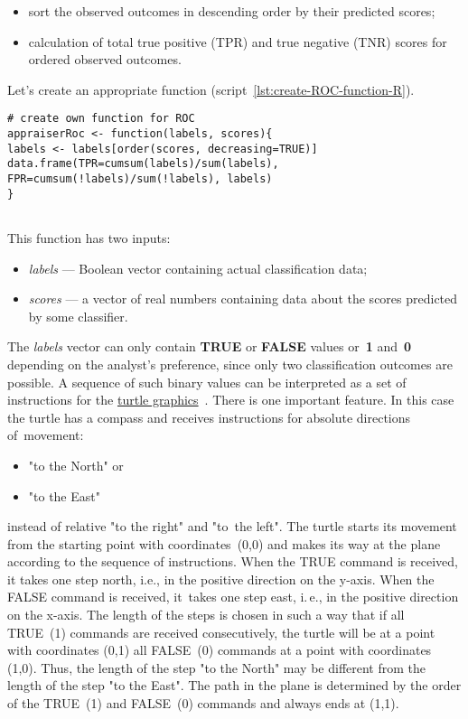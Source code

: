 \documentclass[]{scrreprt}
\begin{document}
\begin{itemize}
	\item sort the observed outcomes in descending order by their predicted scores;
	\item calculation of total true positive (TPR) and true negative (TNR) scores for ordered observed outcomes.
\end{itemize}
Let's create an appropriate function (script~\ref{lst:create-ROC-function-R}).
%
\begin{lstlisting}[float=htp, caption = Creating a~function to~calculate TPR and FPR, firstnumber=1, label= lst:create-ROC-function-R]
# create own function for ROC
appraiserRoc <- function(labels, scores){
labels <- labels[order(scores, decreasing=TRUE)]
data.frame(TPR=cumsum(labels)/sum(labels),
FPR=cumsum(!labels)/sum(!labels), labels)
}
 
\end{lstlisting}
%
This function has two inputs:
\begin{itemize}
	\item \emph{labels} --- Boolean vector containing actual classification data;
	\item \emph{scores} --- a vector of real numbers containing data about the scores predicted by some classifier.
\end{itemize}
%
The \emph{labels} vector can only contain \textbf{TRUE} or \textbf{FALSE} values or~\textbf{1} and~\textbf{0} depending on the analyst's preference, since only two classification outcomes are possible. A sequence of such binary values can be interpreted as a set of instructions for the \href{https://en.wikipedia.org/wiki/Turtle_graphics}{turtle graphics}~\cite{Wiki:turtle-graphics}. There is one important feature. In this case the turtle has a compass and receives instructions for absolute directions of~movement:
\begin{itemize}
	\item "to the North" or
	\item "to the East"
\end{itemize}
instead of relative "to the right" and "to~the left". The turtle starts its movement from the starting point with coordinates~(0,0) and makes its way at the plane according to the sequence of instructions. When the TRUE command is received, it takes one step north, i.e., in the positive direction on the y-axis. When the FALSE command is received, it~takes one step east, i.\,e., in the positive direction on the x-axis. The length of the steps is chosen in such a way that if all TRUE~(1) commands are received consecutively, the turtle will be at a point with coordinates (0,1) all FALSE~(0) commands at a point with coordinates (1,0). Thus, the length of the step "to the North" may be different from the length of the step "to the East". The path in the plane is determined by the order of the TRUE~(1) and FALSE~(0) commands and always ends at (1,1).
\end{document}
